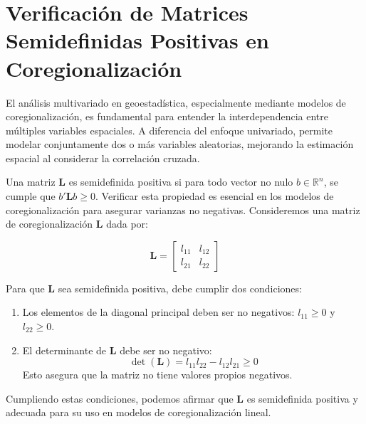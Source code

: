 \section{Verificación de Matrices Semidefinidas Positivas en Coregionalización}

El análisis multivariado en geoestadística, especialmente mediante modelos de coregionalización, es fundamental para entender la interdependencia entre múltiples variables espaciales. A diferencia del enfoque univariado, permite modelar conjuntamente dos o más variables aleatorias, mejorando la estimación espacial al considerar la correlación cruzada.

Una matriz \(\mathbf{L}\) es semidefinida positiva si para todo vector no nulo \(b \in \mathbb{R}^n\), se cumple que \(b'\mathbf{L}b \geq 0\). Verificar esta propiedad es esencial en los modelos de coregionalización para asegurar varianzas no negativas. Consideremos una matriz de coregionalización \(\mathbf{L}\) dada por:

\[
\mathbf{L} = 
\begin{bmatrix}
l_{11} & l_{12} \\
l_{21} & l_{22}
\end{bmatrix}
\]

Para que \(\mathbf{L}\) sea semidefinida positiva, debe cumplir dos condiciones:
\begin{enumerate}
    \item Los elementos de la diagonal principal deben ser no negativos: \(l_{11} \geq 0\) y \(l_{22} \geq 0\).
    \item El determinante de \(\mathbf{L}\) debe ser no negativo:
    \[
    \det(\mathbf{L}) = l_{11}l_{22} - l_{12}l_{21} \geq 0
    \]
    Esto asegura que la matriz no tiene valores propios negativos.
\end{enumerate}

Cumpliendo estas condiciones, podemos afirmar que \(\mathbf{L}\) es semidefinida positiva y adecuada para su uso en modelos de coregionalización lineal.
